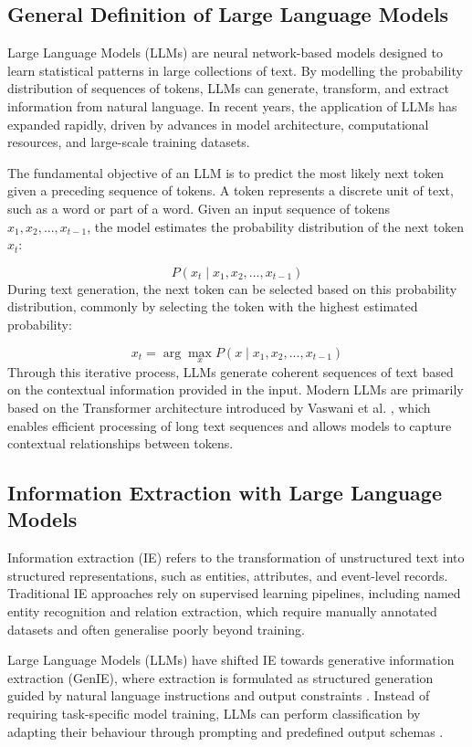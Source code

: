 

\subsection{General Definition of Large Language Models}

Large Language Models (LLMs) are neural network-based models designed to learn statistical patterns in large collections of text. By modelling the probability distribution of sequences of tokens, LLMs can generate, transform, and extract information from natural language. In recent years, the application of LLMs has expanded rapidly, driven by advances in model architecture, computational resources, and large-scale training datasets.

The fundamental objective of an LLM is to predict the most likely next token given a preceding sequence of tokens. A token represents a discrete unit of text, such as a word or part of a word. Given an input sequence of tokens $x_1, x_2, ..., x_{t-1}$, the model estimates the probability distribution of the next token $x_t$:

\[
P(x_t \mid x_1, x_2, ..., x_{t-1})
\] During text generation, the next token can be selected based on this probability distribution, commonly by selecting the token with the highest estimated probability:

\[
x_t = \arg\max_x P(x \mid x_1, x_2, ..., x_{t-1})
\] Through this iterative process, LLMs generate coherent sequences of text based on the contextual information provided in the input. Modern LLMs are primarily based on the Transformer architecture introduced by Vaswani et al. \cite{vaswani2017attention}, which enables efficient processing of long text sequences and allows models to capture contextual relationships between tokens.

\subsection{Information Extraction with Large Language Models}

Information extraction (IE) refers to the transformation of unstructured text into structured representations, such as entities, attributes, and event-level records. Traditional IE approaches rely on supervised learning pipelines, including named entity recognition and relation extraction, which require manually annotated datasets and often generalise poorly beyond  training.

Large Language Models (LLMs) have shifted IE towards generative information extraction (GenIE), where extraction is formulated as structured generation guided by natural language instructions and output constraints \cite{gao2023llmsgenie}. Instead of requiring task-specific model training, LLMs can perform classification by adapting their behaviour through prompting and predefined output schemas \cite{gao2023llmsgenie}.

